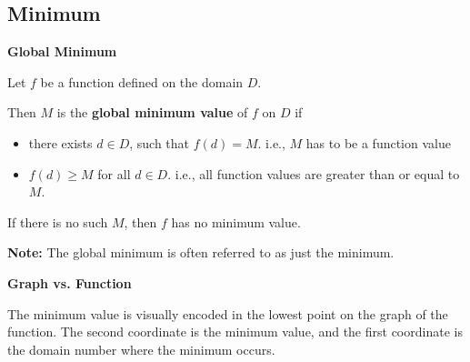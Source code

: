 \documentclass{ximera}
\begin{document}
\subsection*{Minimum}


\begin{definition} \textbf{\textcolor{green!50!black}{Global Minimum}} 


Let $f$ be a function defined on the domain $D$.

Then $M$ is the \textbf{global minimum value} of $f$ on $D$ if    


\begin{itemize}
\item there exists $d \in D$, such that $f(d) = M$.   i.e., $M$ has to be a function value 
\item $f(d) \geq M$ for all $d \in D$. i.e., all function values are greater than or equal to $M$. 

\end{itemize}


If there is no such $M$, then $f$ has no minimum value.



\textbf{Note:} The global minimum is often referred to as just the minimum.

\end{definition}



\begin{observation} \textbf{\textcolor{-red!75}{Graph vs. Function}}

The minimum value is visually encoded in the lowest point on the graph of the function.  The second coordinate is the minimum value, and the first coordinate is the domain number where the minimum occurs.
\end{observation}
\end{document}
